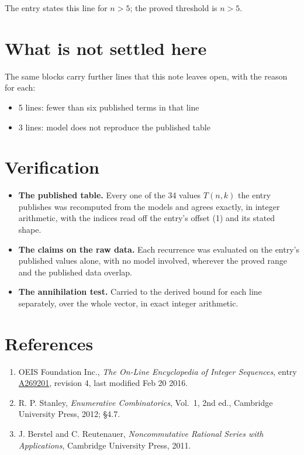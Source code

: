 \documentclass[11pt]{article}
\theoremstyle{definition}
\begin{document}
The entry states this line for $n > 5$; the proved threshold is $n > 5$.

\section{What is not settled here}

The same blocks carry further lines that this note leaves open, with the reason for each:

\begin{itemize}

\item 5 lines: fewer than six published terms in that line

\item 3 lines: model does not reproduce the published table

\end{itemize}

\section{Verification}

\begin{itemize}

\item {\bfseries The published table.} Every one of the 34 values $T(n,k)$ the entry publishes was recomputed from the models and agrees exactly, in integer arithmetic, with the indices read off the entry's offset (1) and its stated shape.

\item {\bfseries The claims on the raw data.} Each recurrence was evaluated on the entry's published values alone, with no model involved, wherever the proved range and the published data overlap.

\item {\bfseries The annihilation test.} Carried to the derived bound for each line separately, over the whole vector, in exact integer arithmetic.

\end{itemize}

\section{References}

\begin{enumerate}

\item OEIS Foundation Inc., \emph{The On-Line Encyclopedia of Integer Sequences}, entry \href{https://oeis.org/A269201}{A269201}, revision 4, last modified Feb 20 2016.

\item R. P. Stanley, \emph{Enumerative Combinatorics}, Vol.~1, 2nd ed., Cambridge University Press, 2012; \S4.7.

\item J. Berstel and C. Reutenauer, \emph{Noncommutative Rational Series with Applications}, Cambridge University Press, 2011.

\end{enumerate}
\end{document}
